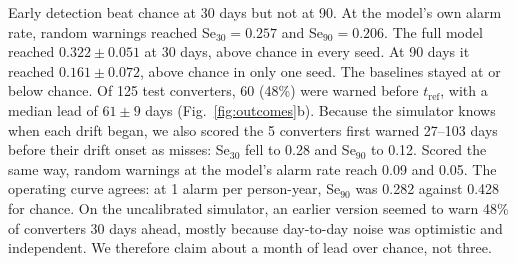 \documentclass[conference]{IEEEtran}
\begin{document}
\begin{table}[t]
\centering
\caption{Held-out results on the calibrated simulator (mean$\pm$SD, three seeds). Se$_{30}$/Se$_{90}$: converters first warned $\geq$30/90 days before $t_{\mathrm{ref}}$. Alarms: warning episodes per non-converter person-year. Chance: random warnings at the full model's alarm rate.}
\label{tab:main}
\setlength{\tabcolsep}{2.5pt}
\footnotesize
{}
\end{table}

Early detection beat chance at 30 days but not at 90. At the model's own alarm rate, random warnings reached Se$_{30}=0.257$ and Se$_{90}=0.206$. The full model reached $0.322\pm0.051$ at 30 days, above chance in every seed. At 90 days it reached $0.161\pm0.072$, above chance in only one seed. The baselines stayed at or below chance. Of 125 test converters, 60 (48\%) were warned before $t_{\mathrm{ref}}$, with a median lead of $61\pm9$ days (Fig.~\ref{fig:outcomes}b). Because the simulator knows when each drift began, we also scored the 5 converters first warned 27--103 days before their drift onset as misses: Se$_{30}$ fell to 0.28 and Se$_{90}$ to 0.12. Scored the same way, random warnings at the model's alarm rate reach 0.09 and 0.05. The operating curve agrees: at 1 alarm per person-year, Se$_{90}$ was 0.282 against 0.428 for chance. On the uncalibrated simulator, an earlier version seemed to warn 48\% of converters 30 days ahead, mostly because day-to-day noise was optimistic and independent. We therefore claim about a month of lead over chance, not three.
\end{document}
